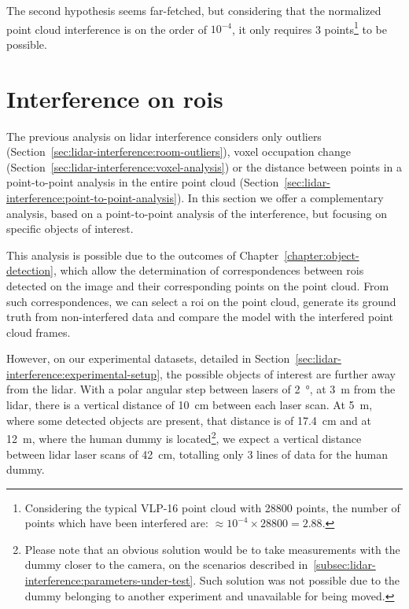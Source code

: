 The second hypothesis seems far-fetched, but considering that the normalized point cloud interference is on the order of $10^{-4}$, it only requires 3 points\footnote{Considering the typical VLP-16 point cloud with 28800 points, the number of points which have been interfered are: $\approx 10^{-4} \times 28800 = 2.88$.} to be possible.




\section{Interference on \acsp{roi}}
\label{sec:lidar-interference:interference-roi}
The previous analysis on \ac{lidar} interference considers only outliers (Section~\ref{sec:lidar-interference:room-outliers}), voxel occupation change (Section~\ref{sec:lidar-interference:voxel-analysis}) or the distance between points in a point-to-point analysis in the entire point cloud (Section~\ref{sec:lidar-interference:point-to-point-analysis}). In this section we offer a complementary analysis, based on a point-to-point analysis of the interference, but focusing on specific objects of interest.

This analysis is possible due to the outcomes of Chapter~\ref{chapter:object-detection}, which allow the determination of correspondences between \acp{roi} detected on the image and their corresponding points on the point cloud. From such correspondences, we can select a \ac{roi} on the point cloud, generate its ground truth from non-interfered data and compare the model with the interfered point cloud frames.

However, on our experimental datasets, detailed in Section~\ref{sec:lidar-interference:experimental-setup}, the possible objects of interest are further away from the \ac{lidar}. With a polar angular step between lasers of \SI{2}{\degree}, at \SI{3}{\meter} from the \ac{lidar}, there is a vertical distance of \SI{10}{\centi\meter} between each laser scan. At \SI{5}{\meter}, where some detected objects are present, that distance is of \SI{17.4}{\centi\meter} and at \SI{12}{\meter}, where the human dummy is located\footnote{Please note that an obvious solution would be to take measurements with the dummy closer to the camera, on the scenarios described in~\ref{subsec:lidar-interference:parameters-under-test}. Such solution was not possible due to the dummy belonging to another experiment and unavailable for being moved.}, we expect a vertical distance between \ac{lidar} \ac{laser} scans of \SI{42}{\centi\meter}, totalling only 3 lines of data for the human dummy.

